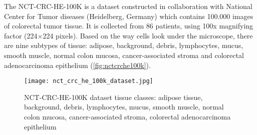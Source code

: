 The NCT-CRC-HE-100K \cite{kather_jakob_nikolas_2018_1214456} is a dataset constructed in collaboration with National Center for Tumor diseases (Heidelberg, Germany) which contains 100.000 images of colorectal tumor tissue. It is collected from 86 patients, using 100x magnifying factor (224$\times$224 pixels). Based on the way cells look under the microscope, there are nine subtypes of tissue: adipose, background, debris, lymphocytes, mucus, smooth muscle, normal colon mucosa, cancer-associated stroma and colorectal adenocarcinoma epithelium (\textcolor{red}{\autoref{fig:nctcrche100k}}).

\begin{figure}[h]
	\centering
	\texttt{[image: nct\_crc\_he\_100k\_dataset.jpg]}
	\caption{NCT-CRC-HE-100K dataset tissue classes: adipose tissue, background, debris, lymphocytes, mucus, smooth muscle, normal colon mucosa, cancer-associated stroma, colorectal adenocarcinoma epithelium}
	\label{fig:nctcrche100k}
\end{figure}

